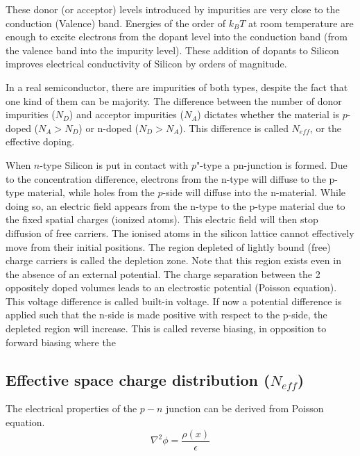 These donor (or acceptor) levels introduced by impurities are very close to the conduction (Valence) band. Energies of the order of $k_B T$ at room temperature are enough to excite electrons from the dopant level into the conduction band (from the valence band into the impurity level). These addition of dopants to Silicon improves electrical conductivity of Silicon by orders of magnitude.

In a real semiconductor, there are impurities of both types, despite the fact that one kind of them can be majority. The difference between the number of donor impurities ($N_D$) and acceptor impurities ($N_A$) dictates whether the material is $p$-doped ($N_A > N_D $) or n-doped ($N_D > N_A$). This difference is called $N_{eff}$, or the effective doping.

When $n$-type Silicon is put in contact with $p$"-type a pn-junction is formed. Due to the concentration difference, electrons from the n-type will diffuse to the p-type material, while holes from the $p$-side will diffuse into the n-material. While doing so, an electric field appears from the n-type to the p-type material due to the fixed spatial charges (ionized atoms). This electric field will then stop diffusion of free carriers. The ionised atoms in the silicon lattice cannot effectively move from their initial positions. The region depleted of lightly bound (free) charge carriers is called the depletion zone. Note that this region exists even in the absence of an external potential. The charge separation between the 2 oppositely doped volumes leads to an electrostic potential (Poisson equation). This voltage difference is called built-in voltage. If now a potential difference is applied such that the n-side is made positive with respect to the p-side, the depleted region will increase. This is called reverse biasing, in opposition to forward biasing where the 


\subsection{Effective space charge distribution ($N_{eff}$)} 

The electrical properties of the $p-n$ junction can be derived from Poisson equation. 
\begin{equation}
\nabla^2 \phi = \frac{\rho(x)}{\epsilon} 
\label{eq:poisson}
\end{equation}

